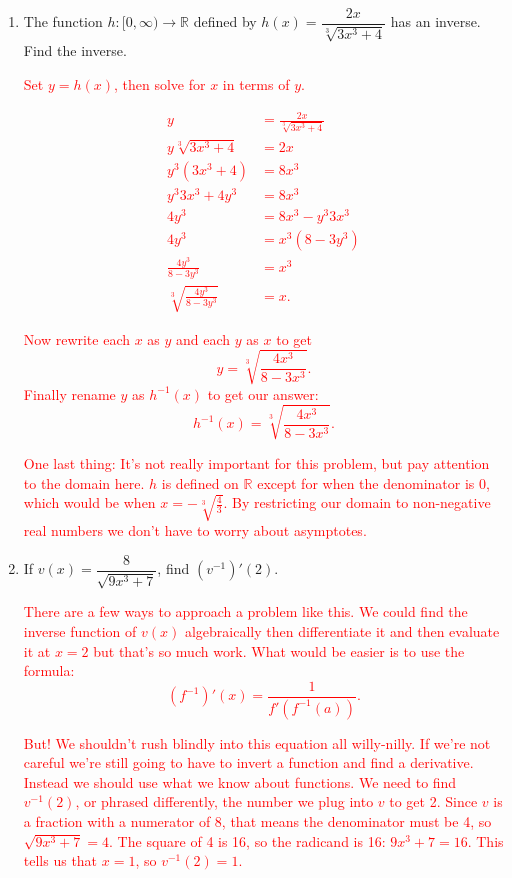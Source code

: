 \documentclass[11pt]{article}
\newcommand{\red}{\textcolor{red}}
\begin{document}
\begin{enumerate}
        \item The function $h:[0,\infty)\to\mathbb{R}$ defined by $h(x)=\dfrac{2x}{\sqrt[3]{3x^{3}+4}}$ has an inverse. Find the inverse.

                \red{Set $y=h(x)$, then solve for $x$ in terms of $y$.}

        \textcolor{red}{
            \begin{align*}
                y                                   &=  \frac{2x}{\sqrt[3]{3x^{3}+4}}\\
                y\sqrt[3]{3x^{3}+4}                 &=  2x\\
                y^{3}(3x^{3}+4)                     &=  8x^{3}\\
                y^{3}3x^{3}+4y^{3}                  &=  8x^{3}\\
                4y^{3}                              &=  8x^{3}-y^{3}3x^{3}\\
                4y^{3}                              &=  x^{3}(8-3y^{3})\\
                \frac{4y^{3}}{8-3y^{3}}             &=  x^{3}\\
                \sqrt[3]{\frac{4y^{3}}{8-3y^{3}}}   &=  x.
            \end{align*}
        }

        \red{Now rewrite each $x$ as $y$ and each $y$ as $x$ to get $$y=\sqrt[3]{\frac{4x^{3}}{8-3x^{3}}}.$$ Finally rename $y$ as $h^{-1}(x)$ to get our answer: $$h^{-1}(x)=\sqrt[3]{\frac{4x^{3}}{8-3x^{3}}}.$$}

        \red{One last thing: It's not really important for this problem, but pay attention to the domain here. $h$ is defined on $\mathbb{R}$ except for when the denominator is $0$, which would be when $x=-\sqrt[3]{\frac{4}{3}}$. By restricting our domain to non-negative real numbers we don't have to worry about asymptotes.}
        
        \item If $v(x)=\dfrac{8}{\sqrt{9x^{3}+7}}$, find $(v^{-1})'(2).$
        
        \red{There are a few ways to approach a problem like this. We could find the inverse function of $v(x)$ algebraically then differentiate it and then evaluate it at $x=2$ but that's so much work. What would be easier is to use the formula: $$(f^{-1})'(x)=\frac{1}{f'(f^{-1}(a))}.$$}

        \red{But! We shouldn't rush blindly into this equation all willy-nilly. If we're not careful we're still going to have to invert a function and find a derivative. Instead we should use what we know about functions. We need to find $v^{-1}(2)$, or phrased differently, the number we plug into $v$ to get 2. Since $v$ is a fraction with a numerator of 8, that means the denominator must be 4, so $\sqrt{9x^{3}+7}=4$. The square of 4 is 16, so the radicand is 16: $9x^{3}+7=16$. This tells us that $x=1$, so $v^{-1}(2)=1$.}


\end{enumerate}
\end{document}
